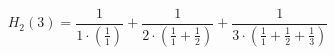 \documentclass{article}
\begin{document}
\begin{displaymath}
  H_2(3) = \frac{1}{1 \cdot \left(\frac{1}{1}\right) } +
  \frac{1}{2\cdot \left(\frac{1}{1} + \frac{1}{2}\right)  } +
  \frac{1}{3\cdot \left(\frac{1}{1} + \frac{1}{2} + \frac{1}{3} \right) }
\end{displaymath}
\end{document}
